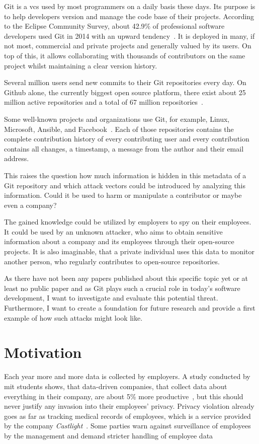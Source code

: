 Git is a \ac{vcs} used by most programmers on a daily basis these days.
Its purpose is to help developers version and manage the code base of their projects.
According to the Eclipse Community Survey, about 42.9\% of professional software developers used Git in 2014 with an upward tendency~\cite{article:git-popularity}.
It is deployed in many, if not most, commercial and private projects and generally valued by its users.
On top of this, it allows collaborating with thousands of contributors on the same project whilst maintaining a clear version history.

Several million users send new commits to their Git repositories every day.
On Github alone, the currently biggest open source platform, there exist about 25 million active repositories and a total of 67 million repositories~\cite{article:github-statistics}.

Some well-known projects and organizations use Git, for example, Linux, Microsoft, Ansible, and Facebook~\cite{article:github-statistics}.
Each of those repositories contains the complete contribution history of every contributing user and every contribution contains all changes, a timestamp, a message from the author and their email address.

This raises the question how much information is hidden in this metadata of a Git repository and which attack vectors could be introduced by analyzing this information.
Could it be used to harm or manipulate a contributor or maybe even a company?

The gained knowledge could be utilized by employers to spy on their employees.
It could be used by an unknown attacker, who aims to obtain sensitive information about a company and its employees through their open-source projects.
It is also imaginable, that a private individual uses this data to monitor another person, who regularly contributes to open-source repositories.

As there have not been any papers published about this specific topic yet or at least no public paper and as Git plays such a crucial role in today's software development, I want to investigate and evaluate this potential threat.
Furthermore, I want to create a foundation for future research and provide a first example of how such attacks might look like.

\section{Motivation}
Each year more and more data is collected by employers.
A study conducted by \ac{mit} students shows, that data-driven companies, that collect data about everything in their company, are about 5\% more productive~\cite{article:management-revolution}, but this should never justify any invasion into their employees' privacy.
Privacy violation already goes as far as tracking medical records of employees, which is a service provided by the company \emph{Castlight}~\cite{article:medical-data}.
Some parties warn against surveillance of employees by the management and demand stricter handling of employee data~\cite{article:vermessung-belegschaft}

